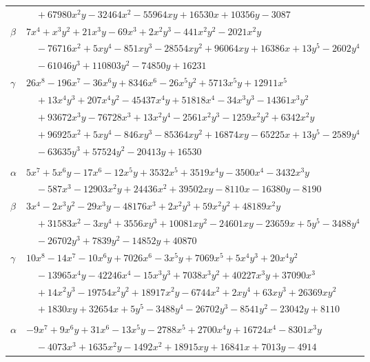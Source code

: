 \documentclass[11pt]{article}
\begin{document}
\begin{longtable}{@{}ll@{}}
 & $\quad +67980x^{2}y-32464x^{2}-55964xy+16530x+10356y-3087$\\
$\beta$ & $7x^{4}+x^{3}y^{2}+21x^{3}y-69x^{3}+2x^{2}y^{3}-441x^{2}y^{2}-2021x^{2}y$\\
 & $\quad -76716x^{2}+5xy^{4}-851xy^{3}-28554xy^{2}+96064xy+16386x+13y^{5}-2602y^{4}$\\
 & $\quad -61046y^{3}+110803y^{2}-74850y+16231$\\
$\gamma$ & $26x^{8}-196x^{7}-36x^{6}y+8346x^{6}-26x^{5}y^{2}+5713x^{5}y+12911x^{5}$\\
 & $\quad +13x^{4}y^{3}+207x^{4}y^{2}-45437x^{4}y+51818x^{4}-34x^{3}y^{3}-14361x^{3}y^{2}$\\
 & $\quad +93672x^{3}y-76728x^{3}+13x^{2}y^{4}-2561x^{2}y^{3}-1259x^{2}y^{2}+6342x^{2}y$\\
 & $\quad +96925x^{2}+5xy^{4}-846xy^{3}-85364xy^{2}+16874xy-65225x+13y^{5}-2589y^{4}$\\
 & $\quad -63635y^{3}+57524y^{2}-20413y+16530$\\
\addlinespace[3pt]
\multicolumn{2}{@{}l}{$\{i,j\}=\{43,46\}$, $k_{ij}=2\cdot 3^{2}\cdot 5\cdot 7\cdot 13$}\\
$\alpha$ & $5x^{7}+5x^{6}y-17x^{6}-12x^{5}y+3532x^{5}+3519x^{4}y-3500x^{4}-3432x^{3}y$\\
 & $\quad -587x^{3}-12903x^{2}y+24436x^{2}+39502xy-8110x-16380y-8190$\\
$\beta$ & $3x^{4}-2x^{3}y^{2}-29x^{3}y-48176x^{3}+2x^{2}y^{3}+59x^{2}y^{2}+48189x^{2}y$\\
 & $\quad +31583x^{2}-3xy^{4}+3556xy^{3}+10081xy^{2}-24601xy-23659x+5y^{5}-3488y^{4}$\\
 & $\quad -26702y^{3}+7839y^{2}-14852y+40870$\\
$\gamma$ & $10x^{8}-14x^{7}-10x^{6}y+7026x^{6}-3x^{5}y+7069x^{5}+5x^{4}y^{3}+20x^{4}y^{2}$\\
 & $\quad -13965x^{4}y-42246x^{4}-15x^{3}y^{3}+7038x^{3}y^{2}+40227x^{3}y+37090x^{3}$\\
 & $\quad +14x^{2}y^{3}-19754x^{2}y^{2}+18917x^{2}y-6744x^{2}+2xy^{4}+63xy^{3}+26369xy^{2}$\\
 & $\quad +1830xy+32654x+5y^{5}-3488y^{4}-26702y^{3}-8541y^{2}-23042y+8110$\\
\addlinespace[3pt]
\multicolumn{2}{@{}l}{$\{i,j\}=\{43,47\}$, $k_{ij}=2\cdot 3^{3}\cdot 7\cdot 13$}\\
$\alpha$ & $-9x^{7}+9x^{6}y+31x^{6}-13x^{5}y-2788x^{5}+2700x^{4}y+16724x^{4}-8301x^{3}y$\\
 & $\quad -4073x^{3}+1635x^{2}y-1492x^{2}+18915xy+16841x+7013y-4914$\\

\end{longtable}
\end{document}
